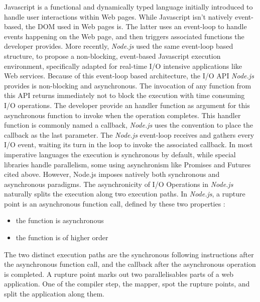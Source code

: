 Javascript is a functional and dynamically typed language initially introduced to handle user interactions within Web pages.
While Javascript isn't natively event-based, the DOM used in Web pages is.
The latter uses an event-loop to handle events happening on the Web page, and then triggers associated functions the developer provides.
More recently, \textit{Node.js} used the same event-loop based structure, to propose a non-blocking, event-based Javascript execution environment, specifically adapted for real-time I/O intensive applications like Web services.
Because of this event-loop based architecture, the I/O API \textit{Node.js} provides is non-blocking and asynchronous.
The invocation of any function from this API returns immediately not to block the execution with time consuming I/O operations.
The developer provide an handler function as argument for this asynchronous function to invoke when the operation completes.
This handler function is commonly named a callback, \textit{Node.js} uses the convention to place the callback as the last parameter.
The \textit{Node.js} event-loop receives and gathers every I/O event, waiting its turn in the loop to invoke the associated callback.
In most imperative languages the execution is synchronous by default, while special libraries handle parallelism, some using asynchronism like Promises and Futures cited above.
However, Node.js imposes natively both synchronous and asynchronous paradigms.
The asynchronicity of I/O Operations in \textit{Node.js} naturally splits the execution along two execution paths.
In \textit{Node.js}, a rupture point is an asynchronous function call, defined by these two properties :
\begin{itemize}
 \item the function is asynchronous
 \item the function is of higher order 
\end{itemize}
The two distinct execution paths are the synchronous following instructions after the asynchronous function call, and the callback after the asynchronous operation is completed.
A rupture point marks out two parallelisables parts of a web application.
One of the compiler step, the mapper, spot the rupture points, and split the application along them.


